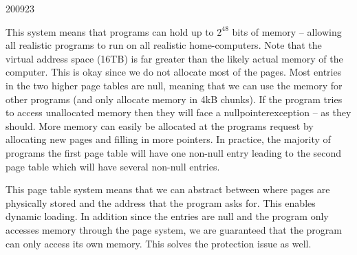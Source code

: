 \documentclass[10pt,\jkfside,a4paper]{article}
\begin{document}
\begin{examquestion}{2009}{2}{3}
\begin{enumerate}
\begin{enumerate}
This system means that programs can hold up to $2^{48}$ bits of memory -- 
allowing all realistic programs to run on all realistic home-computers. 
Note that the virtual address 
space (16TB) is far greater than the likely actual memory of the computer. 
This is okay since we do not allocate most of the pages. Most entries 
in the two higher page tables are null, meaning that we can use the 
memory for other programs (and only allocate memory in 4kB chunks). If the 
program tries to access unallocated memory then they will face a nullpointerexception -- 
as they should. More memory can easily be allocated at the programs request 
by allocating new pages and filling in more pointers.
In practice, the majority of programs the first page table 
will have one non-null entry leading to the second page table which will have 
several non-null entries.

This page table system means that we can abstract between where pages are 
physically stored and the address that the program asks for. This enables 
dynamic loading. In addition since the entries are null and the program 
only accesses memory through the page system, we are guaranteed that the 
program can only access its own memory. This solves the protection issue 
as well.

\end{enumerate}

\end{enumerate}

\end{examquestion}
\end{document}
